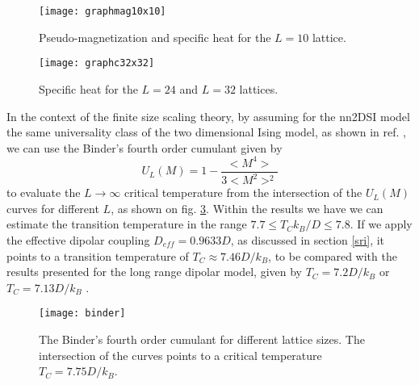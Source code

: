 \documentclass[aps,showkeys,groupedaddress]{revtex4}
\begin{document}
\begin{figure}[ht]
\begin{center}
\texttt{[image: graphmag10x10]}
\end{center}
\caption{Pseudo-magnetization and specific heat for the $L=10$ lattice.}
\label{MCL10}
\end{figure}

\begin{figure}[ht]
\begin{center}
\texttt{[image: graphc32x32]}
\end{center}
\caption{Specific heat for the $L=24$ and $L=32$ lattices.}
\label{C24e32}
\end{figure}

In the context of the finite size scaling theory, by assuming for the nn2DSI model the same universality class of the two dimensional Ising model, as shown in ref. \cite{Xie2015}, we can use the Binder's fourth order cumulant given by
\begin{equation}
U_L(M) = 1 - \frac{<M^4>}{3<M^2>^2}
\end{equation}
to evaluate the $L \rightarrow \infty$ critical temperature from the intersection of the $U_L(M)$ curves for different $L$, as shown on fig. \ref{figBinder}. Within the results we have we can estimate the transition temperature in the range $7.7 \leq T_C k_B/D \leq 7.8$. If we apply the effective dipolar coupling $D_{eff} = 0.9633 D$, as discussed in section \ref{sri}, it points to a transition temperature of $T_C \approx 7.46 D/k_B$, to be compared with the results presented for the long range dipolar model, given by $T_C = 7.2 D/k_B$ \cite{Silva2012} or $T_C = 7.13 D/k_B$ \cite{Li2013}. 

\begin{figure}[ht]
\begin{center}
\texttt{[image: binder]}
\end{center}
\caption{The Binder's fourth order cumulant for different lattice sizes. The intersection of the curves points to a critical temperature $T_C = 7.75 D/k_B$.}
\label{figBinder}
\end{figure}
\end{document}
